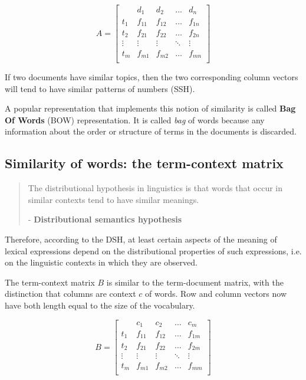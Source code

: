 \begin{equation}
\label{eq:tdmatrix}
A = \begin{bmatrix}
    & d_1 & d_2 & \dots & d_n \\
    t_1 & f_{11} & f_{12} & \dots & f_{1n} \\
    t_2 & f_{21} & f_{22} & \dots & f_{2n} \\
    \vdots & \vdots & \vdots & \ddots & \vdots \\
    t_m & f_{m1} & f_{m2} & \dots & f_{mn} \\
    \end{bmatrix}
\end{equation}

If two documents have similar topics, then the two corresponding column vectors
will tend to have similar patterns of numbers (SSH).

A popular representation that implements this notion of similarity is called \textbf{Bag Of Words} (BOW) representation. It is called \textit{bag} of words because any information about the order or structure of terms in the documents is discarded.

\subsection{Similarity of words: the term-context matrix}

\begin{quote}
The distributional hypothesis in linguistics is that words that occur in
similar contexts tend to have similar meanings.

- \textbf{Distributional semantics hypothesis} \cite{harris}
\end{quote}

Therefore, according to the DSH, at least certain aspects of the
meaning of lexical expressions depend on the distributional properties of such
expressions, i.e. on the linguistic contexts in which they are observed.

The term-context matrix $B$ is similar to the term-document matrix, with the
distinction that columns are context $c$ of words. Row and column vectors now
have both length equal to the size of the vocabulary.

\[
B = \begin{bmatrix}
    & c_1 & c_2 & \dots & c_m \\
    t_1 & f_{11} & f_{12} & \dots & f_{1m} \\
    t_2 & f_{21} & f_{22} & \dots & f_{2m} \\
    \vdots & \vdots & \vdots & \ddots & \vdots \\
    t_m & f_{m1} & f_{m2} & \dots & f_{mm} \\
    \end{bmatrix}
\]

